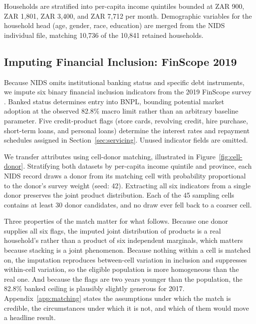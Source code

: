 Households are stratified into per-capita income quintiles bounded at ZAR 900, ZAR 1{,}801, ZAR 3{,}400, and ZAR 7{,}712 per month.
Demographic variables for the household head (age, gender, race, education) are merged from the \ac{NIDS} individual file, matching 10{,}736 of the 10{,}841 retained households.

\subsection{Imputing Financial Inclusion: FinScope 2019}
\label{sec:match}

Because \ac{NIDS} omits institutional banking status and specific debt instruments, we impute six binary financial inclusion indicators from the 2019 \ac{FinScope} survey \cite{finscope2019}.
Banked status determines entry into \ac{BNPL}, bounding potential market adoption at the observed 82.8\% macro limit rather than an arbitrary baseline parameter.
Five credit-product flags (store cards, revolving credit, hire purchase, short-term loans, and personal loans) determine the interest rates and repayment schedules assigned in Section~\ref{sec:servicing}.
Unused indicator fields are omitted.

We transfer attributes using cell-donor matching, illustrated in Figure~\ref{fig:cell-donor}.
Stratifying both datasets by per-capita income quintile and province, each \ac{NIDS} record draws a donor from its matching cell with probability proportional to the donor's survey weight (seed: 42).
Extracting all six indicators from a single donor preserves the joint product distribution.
Each of the 45 sampling cells contains at least 30 donor candidates, and no draw ever fell back to a coarser cell.

Three properties of the match matter for what follows.
Because one donor supplies all six flags, the imputed joint distribution of products is a real household's rather than a product of six independent marginals, which matters because stacking is a joint phenomenon.
Because nothing within a cell is matched on, the imputation reproduces between-cell variation in inclusion and suppresses within-cell variation, so the eligible population is more homogeneous than the real one.
And because the flags are two years younger than the population, the 82.8\% banked ceiling is plausibly slightly generous for 2017.
Appendix~\ref{app:matching} states the assumptions under which the match is credible, the circumstances under which it is not, and which of them would move a headline result.

